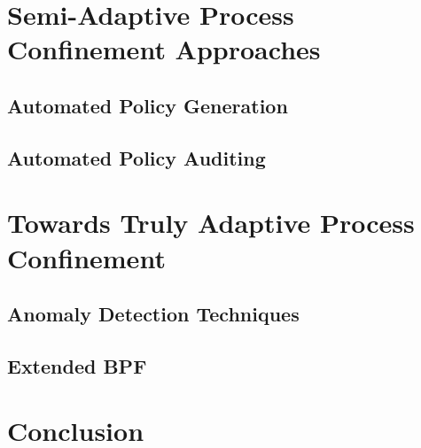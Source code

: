 \documentclass[dvipsnames, 12pt]{article}
\begin{document}


\section{Semi-Adaptive Process Confinement Approaches}
\label{sec:semi-adaptive}

\subsection{Automated Policy Generation}

\subsection{Automated Policy Auditing}

\section{Towards Truly Adaptive Process Confinement}
\label{sec:towards}

\subsection{Anomaly Detection Techniques}

\subsection{Extended BPF}


\section{Conclusion}
\label{sec:conclusion}


\nocite{*} %
\clearpage
\printbibliography
\end{document}
